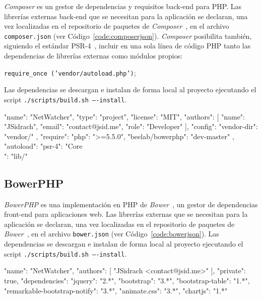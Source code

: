\textit{Composer} es un gestor de dependencias y requisitos \gls{back-end} para \gls{PHP}.
Las librerías externas \gls{back-end} que se necesitan para la aplicación se declaran, una vez localizadas en el repositorio de paquetes de \textit{Composer}~\cite{composerrepositorio}, en el archivo \texttt{composer.json} (ver Código~\ref{code:composerjson}).
\textit{Composer} posibilita también, siguiendo el estándar PSR-4~\cite{psr4}, incluir en una sola línea de código \gls{PHP} tanto las dependencias de librerías externas como módulos propios:

\texttt{require\_once ('vendor/autoload.php')};

Las dependencias se descargan e instalan de forma local al proyecto ejecutando el \gls{script} \texttt{./scripts/build.sh ----install}.

\begin{code}[label=code:composerjson,language=json,caption=Ejemplo de fichero \textit{composer.json}]
{
  "name": "NetWatcher",
  "type": "project",
  "license": "MIT",
  "authors": [
    {
      "name": "JSidrach",
      "email": "contact@jsid.me",
      "role": "Developer"
    }
  ],
  "config": {
    "vendor-dir": "vendor/"
   },
  "require": {
    "php": ">=5.5.0",
    "beelab/bowerphp": "dev-master"
  },
  "autoload": {
    "psr-4": {
      "Core\\": "lib/"
    }
  }
}
\end{code}

\subsection*{BowerPHP\label{extra:mvc:bowerphp}}

\textit{BowerPHP} es una implementación en \gls{PHP} de \textit{Bower}~\cite{bower}, un gestor de dependencias \gls{front-end} para aplicaciones web.
Las librerías externas que se necesitan para la aplicación se declaran, una vez localizadas en el repositorio de paquetes de \textit{Bower}~\cite{bowerrepositorio}, en el archivo \texttt{bower.json} (ver Código~\ref{code:bowerjson}).
Las dependencias se descargan e instalan de forma local al proyecto ejecutando el \gls{script} \texttt{./scripts/build.sh ----install}.

\begin{code}[label=code:bowerjson,language=json,caption=Ejemplo de fichero \textit{bower.json}]
{
  "name": "NetWatcher",
  "authors": [
    "JSidrach <contact@jsid.me>"
  ],
  "private": true,
  "dependencies": {
    "jquery": "2.*",
    "bootstrap": "3.*",
    "bootstrap-table": "1.*",
    "remarkable-bootstrap-notify": "3.*",
    "animate.css": "3.*",
    "chartjs": "1.*"
  }
}
\end{code}

